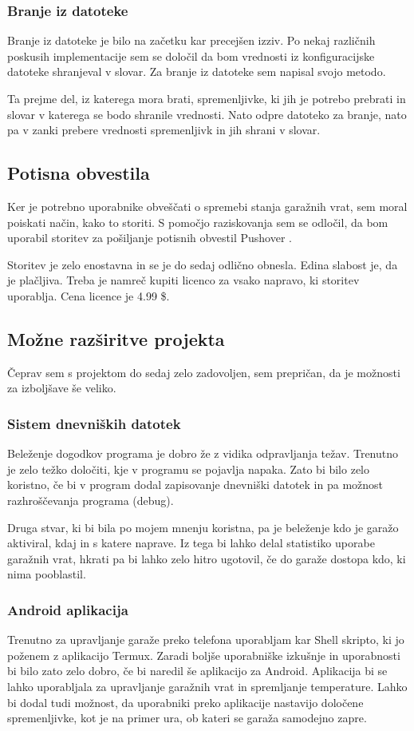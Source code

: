 \documentclass[11pt]{article}
\begin{document}
\subsubsection{Branje iz datoteke}
Branje iz datoteke je bilo na začetku kar precejšen izziv. Po nekaj različnih poskusih implementacije sem se določil da bom vrednosti iz konfiguracijske datoteke shranjeval v slovar. Za branje iz datoteke sem napisal svojo metodo.

Ta prejme del, iz katerega mora brati, spremenljivke, ki jih je potrebo prebrati in slovar v katerega se bodo shranile vrednosti. Nato odpre datoteko za branje, nato pa v zanki prebere vrednosti spremenljivk in jih shrani v slovar.

\subsection{Potisna obvestila}
Ker je potrebno uporabnike obveščati o spremebi stanja garažnih vrat, sem moral poiskati način, kako to storiti. S pomočjo raziskovanja sem se odločil, da bom uporabil storitev za pošiljanje potisnih obvestil Pushover \cite{Pushover}.

Storitev je zelo enostavna in se je do sedaj odlično obnesla. Edina slabost je, da je plačljiva. Treba je namreč kupiti licenco za vsako napravo, ki storitev uporablja. Cena licence je 4.99 \$.
\subsection{Možne razširitve projekta}
Čeprav sem s projektom do sedaj zelo zadovoljen, sem prepričan, da je možnosti za izboljšave še veliko.
\subsubsection{Sistem dnevniških datotek}
Beleženje dogodkov programa je dobro že z vidika odpravljanja težav. Trenutno je zelo težko določiti, kje v programu se pojavlja napaka. Zato bi bilo zelo koristno, če bi v program dodal zapisovanje dnevniški datotek in pa možnost razhroščevanja programa (debug).

Druga stvar, ki bi bila po mojem mnenju koristna, pa je beleženje kdo je garažo aktiviral, kdaj in s katere naprave. Iz tega bi lahko delal statistiko uporabe garažnih vrat, hkrati pa bi lahko zelo hitro ugotovil, če do garaže dostopa kdo, ki nima pooblastil.
\subsubsection{Android aplikacija}
Trenutno za upravljanje garaže preko telefona uporabljam kar Shell skripto, ki jo poženem z aplikacijo Termux. Zaradi boljše uporabniške izkušnje in uporabnosti bi bilo zato zelo dobro, če bi naredil še aplikacijo za Android. Aplikacija bi se lahko uporabljala za upravljanje garažnih vrat in spremljanje temperature. Lahko bi dodal tudi možnost, da uporabniki preko aplikacije nastavijo določene spremenljivke, kot je na primer ura, ob kateri se garaža samodejno zapre.
\end{document}
